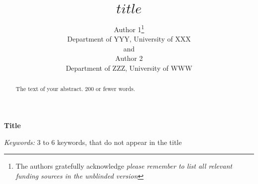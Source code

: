 \def\spacingset#1{\renewcommand{\baselinestretch}%
{#1}\small\normalsize} \spacingset{1}



\blind
{
  \title{\bf $title$}
  \author{Author 1\thanks{
    The authors gratefully acknowledge \textit{please remember to list all relevant funding sources in the unblinded version}}\hspace{.2cm}\\
    Department of YYY, University of XXX\\
    and \\
    Author 2 \\
    Department of ZZZ, University of WWW}
  \maketitle
} \fi

\blind
{
  \bigskip
  \bigskip
  \bigskip
  \begin{center}
    {\LARGE\bf Title}
\end{center}
  \medskip
} \fi

\bigskip
\begin{abstract}
The text of your abstract. 200 or fewer words.
\end{abstract}

\noindent%
{\it Keywords:}  3 to 6 keywords, that do not appear in the title
\vfill

\newpage
\spacingset{1.9} %